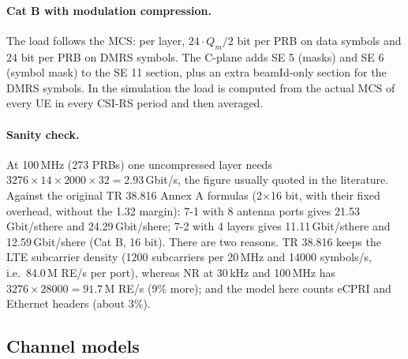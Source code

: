 \documentclass[11pt,a4paper]{article}
\newcommand{\Gbps}{\,Gbit/s}
\begin{document}
\paragraph{Cat B with modulation compression.} The load follows the MCS: per layer, $24 \cdot Q_m/2$ bit per PRB on data
symbols and 24 bit per PRB on DMRS symbols. The C-plane adds SE 5 (masks) and SE 6 (symbol mask) to the SE 11 section, plus an
extra beamId-only section for the DMRS symbols. In the simulation the load is computed from the actual MCS of every UE in every
CSI-RS period and then averaged.

\paragraph{Sanity check.} At 100\,MHz (273 PRBs) one uncompressed layer needs $3276 \times 14 \times 2000 \times 32 = 2.93$\Gbps,
the figure usually quoted in the literature. Against the original TR 38.816 Annex A formulas (2$\times$16 bit, with their fixed
overhead, without the 1.32 margin): 7-1 with 8 antenna ports gives 21.53\Gbps there and 24.29\Gbps here; 7-2 with 4 layers gives
11.11\Gbps there and 12.59\Gbps here (Cat B, 16 bit). There are two reasons. TR 38.816 keeps the LTE subcarrier density (1200
subcarriers per 20\,MHz and 14000 symbols/s, i.e.\ 84.0\,M RE/s per port), whereas NR at 30\,kHz and 100\,MHz has
$3276 \times 28000 = 91.7$\,M RE/s (9\% more); and the model here counts eCPRI and Ethernet headers (about 3\%).

\subsection{Channel models}
\end{document}
